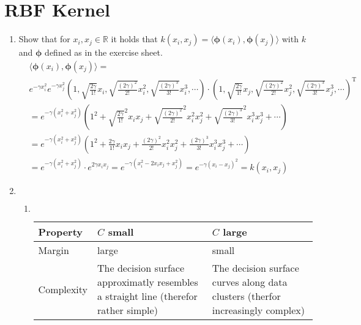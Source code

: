 \documentclass[DIN, pagenumber=false, fontsize=11pt, parskip=half]{scrartcl}
\newcommand{\R}[0]{\mathbb{R}}
\begin{document}
    \section{RBF Kernel}
    \begin{enumerate}
        \item
        Show that for $x_i, x_j \in \R$ it holds that $k(x_i, x_j) = \langle \bm{\phi}(x_i), \bm{\phi}(x_j) \rangle$
        with $k$ and $\bm{\phi}$ defined as in the exercise sheet.
        \begin{align*}
             &\langle \bm{\phi}(x_i), \bm{\phi}(x_j) \rangle = \\
             &e^{-\gamma x_i^2} e^{-\gamma x_j^2}
             \left( 1, \sqrt{\frac{2 \gamma}{1!}} x_i, \sqrt{\frac{(2 \gamma)^2}{2!}} x_i^2,
             \sqrt{\frac{(2 \gamma)^3}{3!}} x_i^3, \cdots \right) \cdot
             \left( 1, \sqrt{\frac{2 \gamma}{1!}} x_j, \sqrt{\frac{(2 \gamma)^2}{2!}} x_j^2,
             \sqrt{\frac{(2 \gamma)^3}{3!}} x_j^3, \cdots \right)^\text{T} \\
             &= e^{-\gamma (x_i^2 + x_j^2)} \left( 1^2 + \sqrt{\frac{2 \gamma}{1!}}^2 x_i x_j
             + \sqrt{\frac{(2 \gamma)^2}{2!}}^2 x_i^2 x_j^2 + \sqrt{\frac{(2 \gamma)^3}{3!}}^2
             x_i^3 x_j^3 + \cdots \right) \\
             &= e^{-\gamma (x_i^2 +  x_j^2)} \left( 1^2 + \frac{2 \gamma}{1!} x_i x_j
             + \frac{(2 \gamma)^2}{2!} x_i^2 x_j^2 + \frac{(2 \gamma)^3}{3!} x_i^3 x_j^3
             + \cdots \right) \\
             &= e^{-\gamma (x_i^2 +  x_j^2)} \cdot e^{2 \gamma x_i x_j}
             = e^{-\gamma (x_i^2 - 2 x_i x_j + x_j^2)} = e^{-\gamma (x_i - x_j)^2} = k(x_i, x_j)
        \end{align*}
        \item
        $ $
        \begin{enumerate}
            \item
            $ $
            \begin{table}[H]
                \centering
                \begin{tabularx}{\textwidth}{l|X|X}
                    \toprule
                    Property & $C$ small & $C$ large \\
                    \midrule
                    Margin & large & small \\
                    Complexity & The decision surface approximatly resembles a straight line (therefor rather simple) &
                    The decision surface curves along data clusters (therfor increasingly complex)\\

\end{tabularx}
\end{table}
\end{enumerate}
\end{enumerate}
\end{document}
